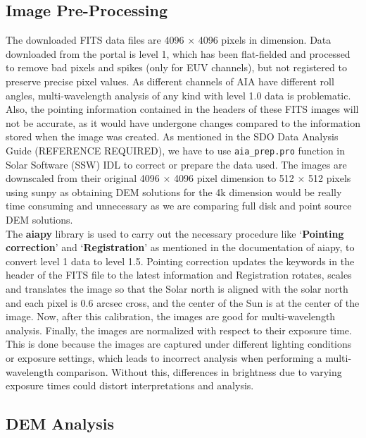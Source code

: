 \message{ !name(main.tex)}\documentclass[12pt]{article}
\begin{document}
\subsection{Image Pre-Processing}
\label{sec:data_pre_processing}

The downloaded FITS data files are 4096 $\times$ 4096 pixels in dimension. Data downloaded from the portal is level 1, which has been flat-fielded and processed to remove bad pixels and spikes (only for EUV channels), but not registered to preserve precise pixel values. As different channels of AIA have different roll angles, multi-wavelength analysis of any kind with level 1.0 data is problematic. Also, the pointing information contained in the headers of these FITS images will not be accurate, as it would have undergone changes compared to the information stored when the image was created. As mentioned in the SDO Data Analysis Guide (REFERENCE REQUIRED), we have to use \texttt{aia\_prep.pro} function in Solar Software (SSW) IDL to correct or prepare the data used. The images are downscaled from their original 4096 $\times$ 4096 pixel dimension to 512 $\times$ 512 pixels using sunpy as obtaining DEM solutions for the 4k dimension would be really time consuming and unnecessary as we are comparing full disk and point source DEM solutions.\\

The \textbf{aiapy} library is used to carry out the necessary procedure like `\textbf{Pointing correction}' and `\textbf{Registration}' as mentioned in the documentation of aiapy, to convert level 1 data to level 1.5. Pointing correction updates the keywords in the header of the FITS file to the latest information and Registration rotates, scales and translates the image so that the Solar north is aligned with the solar north and each pixel is 0.6 arcsec cross, and the center of the Sun is at the center of the image. Now, after this calibration, the images are good for multi-wavelength analysis. Finally, the images are normalized with respect to their exposure time. This is done because the images are captured under different lighting conditions or exposure settings, which leads to incorrect analysis when performing a multi-wavelength comparison. Without this, differences in brightness due to varying exposure times could distort interpretations and analysis.

\subsection{DEM Analysis}
\label{sec:dem_analysis}
\end{document}
